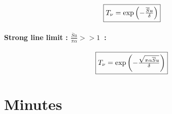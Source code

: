 \documentclass[a4paper]{article}
\begin{document}
{\begin{equation}
\fbox{$
T_\nu=\exp \left(
 - \frac{\overline{S}u}{\delta}
 \right)
$}
\end{equation}


\paragraph{Strong line limit : $\frac{\overline{S}u}{\pi \alpha}>>1$~:}
\begin{equation}
\fbox{$
T_\nu=\exp \left(
 - \frac{\sqrt{\pi\alpha \overline{S}u}}{\delta}
 \right)
$}
\end{equation}

}  %

\newpage

\appendix

\section{Minutes}
\end{document}
